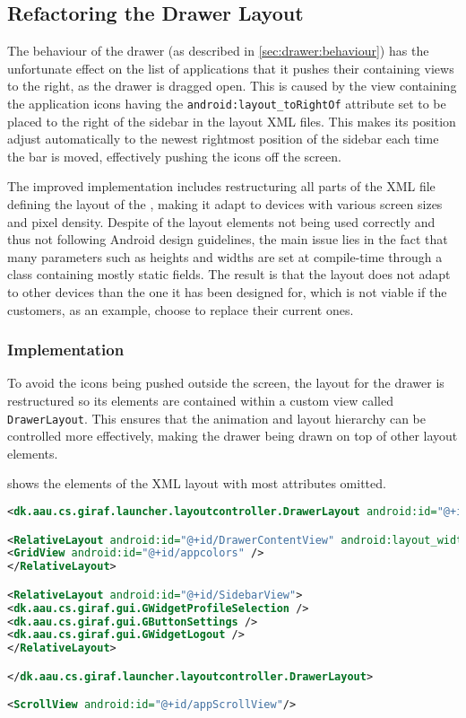 \subsection{Refactoring the Drawer Layout}
The behaviour of the drawer (as described in \cref{sec:drawer:behaviour}) has the unfortunate effect on the list of applications that it pushes their containing views to the right, as the drawer is dragged open.
This is caused by the view containing the application icons having the  \lstinline{android:layout_toRightOf} attribute set to be placed to the right of the sidebar in the layout XML files.
This makes its position adjust automatically to the newest rightmost position of the sidebar each time the bar is moved, effectively pushing the icons off the screen.

The improved implementation includes restructuring all parts of the XML file defining the layout of the \homeactivity, making it adapt to devices with various screen sizes and pixel density.
Despite of the layout elements not being used correctly and thus not following Android design guidelines, the main issue lies in the fact that many parameters such as heights and widths are set at compile-time through a class containing mostly static fields.
The result is that the layout does not adapt to other devices than the one it has been designed for, which is not viable if the customers, as an example, choose to replace their current ones.

\subsubsection{Implementation}\label{sec:sidebarlayout:xml}
To avoid the icons being pushed outside the screen, the layout for the drawer is restructured so its elements are contained within a custom view called \lstinline|DrawerLayout|.
This ensures that the animation and layout hierarchy can be controlled more effectively, making the drawer being drawn on top of other layout elements.

 shows the elements of the XML layout with most attributes omitted.

\begin{lstlisting}[caption={Structure of the XML layout of the drawer.},label={lst:sidebarlayout}, language=XML]
<dk.aau.cs.giraf.launcher.layoutcontroller.DrawerLayout android:id="@+id/DrawerView" android:layout_marginLeft="-400dp">

<RelativeLayout android:id="@+id/DrawerContentView" android:layout_width="400dp">
<GridView android:id="@+id/appcolors" />
</RelativeLayout>

<RelativeLayout android:id="@+id/SidebarView">
<dk.aau.cs.giraf.gui.GWidgetProfileSelection />
<dk.aau.cs.giraf.gui.GButtonSettings />
<dk.aau.cs.giraf.gui.GWidgetLogout />
</RelativeLayout>

</dk.aau.cs.giraf.launcher.layoutcontroller.DrawerLayout>

<ScrollView android:id="@+id/appScrollView"/>
\end{lstlisting}

